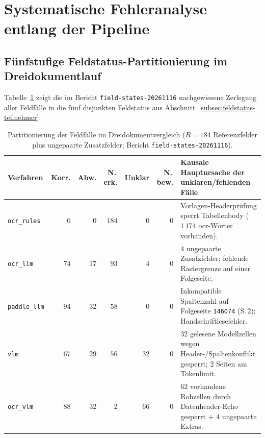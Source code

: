 \section{Systematische Fehleranalyse entlang der Pipeline}
\label{sec:ergebnisse-fehleranalyse}

\subsection{Fünfstufige Feldstatus-Partitionierung im Dreidokumentlauf}
\label{subsec:ergebnisse-feldstatus}

Tabelle~\ref{tab:feldstatus-dreidokument} zeigt die im Bericht \texttt{field-states-20261116} nachgewiesene Zerlegung aller Feldfälle in die fünf disjunkten Feldstatus aus Abschnitt~\ref{subsec:feldstatus-teilnehmer}.

\begin{table}[htbp]
  \centering
  \caption[Partitionierung der Feldfälle in fünf Feldstatus im Dreidokumentvergleich]{Partitionierung der Feldfälle im Dreidokumentvergleich ($R = 184$ Referenzfelder plus ungepaarte Zusatzfelder; Bericht \texttt{field-states-20261116}).}
  \label{tab:feldstatus-dreidokument}
  \footnotesize
  \setlength{\tabcolsep}{4pt}
  \begin{tabularx}{\textwidth}{@{}l r r r r r >{\raggedright\arraybackslash}X@{}}
    \toprule
    \textbf{Verfahren} & \textbf{Korr.} & \textbf{Abw.} & \textbf{N.\,erk.} & \textbf{Unklar} & \textbf{N.\,bew.} & \textbf{Kausale Hauptursache der unklaren/fehlenden Fälle} \\
    \midrule
    \texttt{ocr\_rules} & $0$ & $0$ & $184$ & $0$ & $0$ & Vorlagen-Headerprüfung sperrt Tabellenbody ($1\,174$ \ac{ocr}-Wörter vorhanden). \\
    \texttt{ocr\_llm} & $74$ & $17$ & $93$ & $4$ & $0$ & $4$ ungepaarte Zusatzfelder; fehlende Rastergrenze auf einer Folgeseite. \\
    \texttt{paddle\_llm} & $94$ & $32$ & $58$ & $0$ & $0$ & Inkompatible Spaltenzahl auf Folgeseite \texttt{146074} (S.\,2); Handschriftlesefehler. \\
    \texttt{vlm} & $67$ & $29$ & $56$ & $32$ & $0$ & $32$ gelesene Modellzellen wegen Header-/Spaltenkonflikt gesperrt; $2$ Seiten am Tokenlimit. \\
    \texttt{ocr\_vlm} & $88$ & $32$ & $2$ & $66$ & $0$ & $62$ vorhandene Rohzellen durch Datenheader-Echo gesperrt + $4$ ungepaarte Extras. \\
    \bottomrule
  \end{tabularx}
\end{table}

